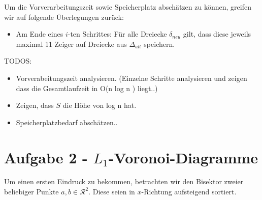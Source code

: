 \documentclass[a4paper]{article}
\begin{document}
Um die Vorverarbeitungszeit sowie Speicherplatz abschätzen zu können, greifen wir auf folgende Überlegungen zurück:

\begin{itemize}
\item Am Ende eines $i$-ten Schrittes: Für alle Dreiecke $\delta_{neu}$ gilt, dass diese jeweils maximal 11 Zeiger auf Dreiecke aus $\Delta_{alt}$ speichern.
\end{itemize}

TODOS:
\begin{itemize}
 \item Vorverabeitungszeit analysieren. (Einzelne Schritte analysieren und zeigen dass die Gesamtlaufzeit in O(n log n ) liegt..)
 \item Zeigen, dass $S$ die Höhe von log n hat. 
 \item Speicherplatzbedarf abschätzen.. 
\end{itemize}


\section*{Aufgabe 2 - $L_1$-Voronoi-Diagramme}

Um einen ersten Eindruck zu bekommen, betrachten wir den Bisektor zweier beliebiger Punkte $a, b \in \mathcal{R}^2$. Diese seien in $x$-Richtung aufsteigend sortiert. 
\end{document}
